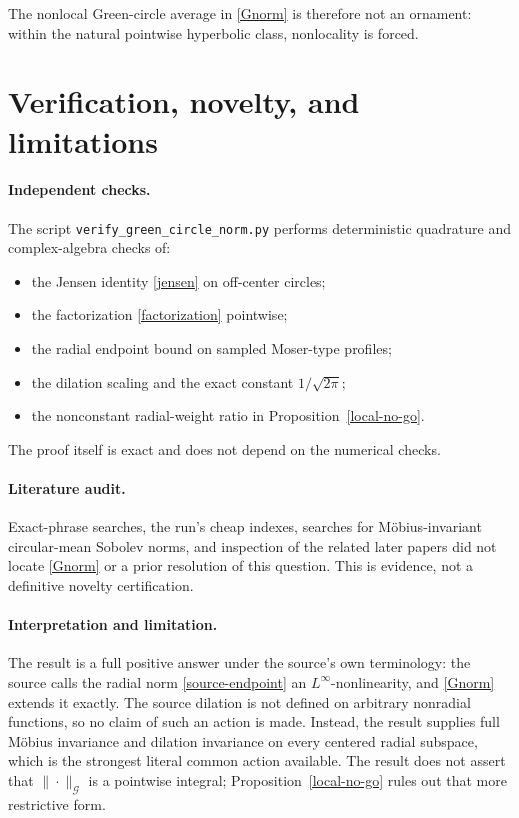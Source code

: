 \documentclass[11pt]{article}
\newcommand{\G}{\mathcal G}
\begin{document}
The nonlocal Green-circle average in \eqref{Gnorm} is therefore not an
ornament: within the natural pointwise hyperbolic class, nonlocality is
forced.

\section{Verification, novelty, and limitations}

\paragraph{Independent checks.}
The script \texttt{verify\_green\_circle\_norm.py} performs deterministic
quadrature and complex-algebra checks of:
\begin{itemize}
\item the Jensen identity \eqref{jensen} on off-center circles;
\item the factorization \eqref{factorization} pointwise;
\item the radial endpoint bound on sampled Moser-type profiles;
\item the dilation scaling and the exact constant $1/\sqrt{2\pi}$;
\item the nonconstant radial-weight ratio in Proposition~\ref{local-no-go}.
\end{itemize}
The proof itself is exact and does not depend on the numerical checks.

\paragraph{Literature audit.}
Exact-phrase searches, the run's cheap indexes, searches for
M\"obius-invariant circular-mean Sobolev norms, and inspection of the
related later papers \cite{ATcompact,TintarevRemainder,YangZhu} did not
locate \eqref{Gnorm} or a prior resolution of this question.  This is
evidence, not a definitive novelty certification.

\paragraph{Interpretation and limitation.}
The result is a full positive answer under the source's own terminology:
the source calls the radial norm \eqref{source-endpoint} an
$L^\infty$-nonlinearity, and \eqref{Gnorm} extends it exactly.  The
source dilation is not defined on arbitrary nonradial functions, so no
claim of such an action is made.  Instead, the result supplies full
M\"obius invariance and dilation invariance on every centered radial
subspace, which is the strongest literal common action available.
The result does not assert that $\|\cdot\|_{\G}$ is a pointwise integral;
Proposition~\ref{local-no-go} rules out that more restrictive form.
\end{document}
